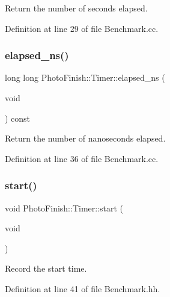 Return the number of seconds elapsed. 



Definition at line 29 of file Benchmark.\+cc.

\mbox{\label{class_photo_finish_1_1_timer_a147dff662681f10ad8afd1b5492f7c6a}} 
\subsubsection{\texorpdfstring{elapsed\+\_\+ns()}{elapsed\_ns()}}
{\footnotesize\ttfamily long long Photo\+Finish\+::\+Timer\+::elapsed\+\_\+ns (\begin{DoxyParamCaption}\item[{void}]{ }\end{DoxyParamCaption}) const}



Return the number of nanoseconds elapsed. 



Definition at line 36 of file Benchmark.\+cc.

\mbox{\label{class_photo_finish_1_1_timer_ae78ca8dbd0d6941f38089c00670e1026}} 
\subsubsection{\texorpdfstring{start()}{start()}}
{\footnotesize\ttfamily void Photo\+Finish\+::\+Timer\+::start (\begin{DoxyParamCaption}\item[{void}]{ }\end{DoxyParamCaption})\hspace{0.3cm}{\ttfamily [inline]}}



Record the start time. 



Definition at line 41 of file Benchmark.\+hh.

\mbox{\label{class_photo_finish_1_1_timer_ac7561d15636df785b1ef02eec31151e4}} 
